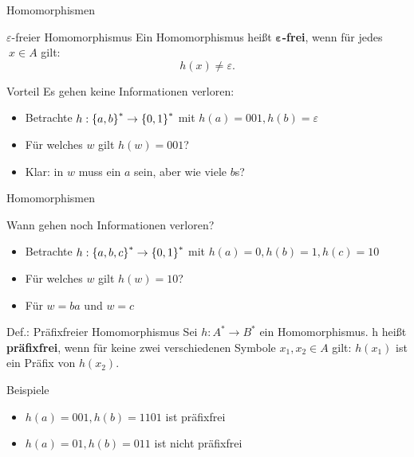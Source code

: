 \begin{frame}{Homomorphismen}
	\begin{block}{$\varepsilon$-freier Homomorphismus}
		Ein Homomorphismus heißt \textbf{$\mathbf{\varepsilon}$-frei}, wenn für jedes $\ x\in A$ gilt:
		$$ h(x) \neq \varepsilon. $$
	\end{block}

	\begin{exampleblock}{Vorteil}
		\pause Es gehen keine Informationen verloren:\\
		\begin{itemize}
			\item Betrachte $h: \left\{ a,b \right\}^* \to \left\{ 0,1 \right\}^*$ mit $h(a)=001, h(b)=\varepsilon$
			\item Für welches $w$ gilt $h(w)=001$?
			\item Klar: in $w$ muss ein $a$ sein, aber wie viele $b$s?
		\end{itemize}
	\end{exampleblock}
\end{frame}

\begin{frame}{Homomorphismen}
	\begin{exampleblock}{Wann gehen noch Informationen verloren?}
		\begin{itemize}
			\item Betrachte $h: \left\{ a, b, c \right\}^* \to \left\{ 0,1 \right\}^*$ mit $h(a)=0, h(b)=1, h(c)=10$
			\item Für welches $w$ gilt $h(w)=10$?
			\item \pause Für $w=ba$ und $w=c$
		\end{itemize}
	\end{exampleblock}
	\pause
	\begin{block}{Def.: Präfixfreier Homomorphismus}
		Sei $h: A^* \to B^* $ ein Homomorphismus. h heißt \textbf{präfixfrei}, wenn für
		keine zwei verschiedenen Symbole $x_1,x_2\in A$ gilt: $h(x_1)$
		ist ein Präfix von $h(x_2)$.
	\end{block}
	\begin{exampleblock}{Beispiele}
		\begin{itemize}
			\item $h(a)=001, h(b)=1101$ ist präfixfrei
			\item $h(a)=01, h(b)=011$ ist nicht präfixfrei 
		\end{itemize}
	\end{exampleblock}
\end{frame}

